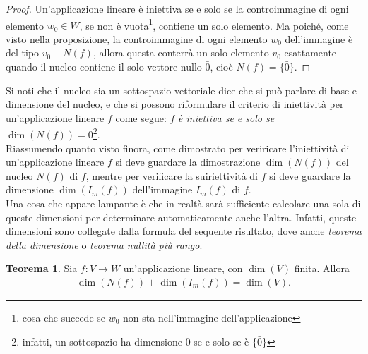 \documentclass{book}
\theoremstyle{definition}
\newtheorem{teo}{Teorema}[section]
\theoremstyle{plain}
\begin{document}
\begin{proof}
  Un'applicazione lineare è iniettiva se e solo se la controimmagine di ogni elemento $w_0\in W$, se
  non è vuota\footnote{cosa che succede se $w_0$ non sta nell'immagine dell'applicazione}, contiene
  un solo elemento. Ma poiché, come visto nella proposizione, la controimmagine di ogni elemento $w_0$
  dell'immagine è del tipo $v_0+N(f)$, allora questa conterrà un solo elemento $v_0$ esattamente quando
  il nucleo contiene il solo vettore nullo $\bar{0}$, cioè $N(f)=\{\bar{0}\}$.
\end{proof}
Si noti che il nucleo sia un sottospazio vettoriale dice che si può parlare di base e dimensione del
nucleo, e che si possono riformulare il criterio di iniettività per un'applicazione lineare $f$ come
segue: $f$ \emph{è iniettiva se e solo se} $\dim(N(f))=0$\footnote{infatti, un sottospazio ha dimensione
  0 se e solo se è $\{\bar{0}\}$}.\\
Riassumendo quanto visto finora, come dimostrato per veriricare l'iniettività di un'applicazione
lineare $f$ si deve guardare la dimostrazione $\dim(N(f))$ del nucleo $N(f)$ di $f$, mentre per
verificare la suiriettività di $f$ si deve guardare la dimensione $\dim(I_m(f))$ dell'immagine
$I_m(f)$ di $f$.\\
Una cosa che appare lampante è che in realtà sarà sufficiente calcolare una sola di queste dimensioni
per determinare automaticamente anche l'altra. Infatti, queste dimensioni sono collegate dalla formula
del sequente risultato, dove anche \emph{teorema della dimensione} o \emph{teorema nullità più rango}.
\begin{teo}
  \label{teo:iniediappllin1}
  Sia $f:V\to W$ un'applicazione lineare, con $\dim(V)$ finita. Allora
  \begin{eqnarray}
    \label{eq:iniediappllin1-1}
    \dim(N(f))+\dim(I_m(f))=\dim(V).
  \end{eqnarray}
\end{teo}
\end{document}
